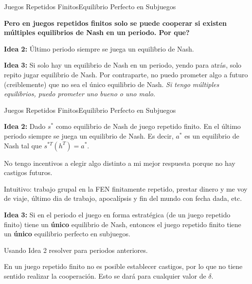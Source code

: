 \documentclass[notes, 11pt]{beamer} %
\newenvironment{wideitemize}{\itemize\addtolength{\itemsep}{10pt}}{\enditemize}
\begin{document}
\begin{frame}{Juegos Repetidos Finitos}{Equilibrio Perfecto en Subjuegos}
	\begin{wideitemize}

		\item<1-> \textbf{Pero en juegos repetidos finitos solo se puede cooperar si existen m\'ultiples equilibrios de Nash en un periodo. Por que? }
		\begin{wideitemize}
			\item<2->[*] \textbf{Idea 2:} \'Ultimo periodo siempre se juega un equilibrio de Nash.
			\item<3->[*] \textbf{Idea 3:} Si solo hay un equilibrio de Nash en un periodo, yendo para atr\'as, solo repito jugar equilibrio de Nash. Por contraparte, no puedo prometer algo a futuro (creiblemente) que no sea el \'unico equilibrio de Nash. \textit{Si tengo m\'ultiples equilibrios, puedo prometer uno bueno o uno malo.}
		\end{wideitemize}

	\end{wideitemize}
\end{frame}



\begin{frame}{Juegos Repetidos Finitos}{Equilibrio Perfecto en Subjuegos}
	\begin{wideitemize}
		\item<1-> \textbf{Idea 2:} Dado $s^{*}$ como equilibrio de Nash de juego repetido finito. En el \'ultimo periodo siempre se juega un equilibrio de Nash. Es decir, $a^{*}$ es un equilibrio de Nash tal que $s^{*T}(h^{T}) = a^{*}$.
			\begin{wideitemize}
				\item<2->[--] No tengo incentivos a elegir algo distinto a mi mejor respuesta porque no hay castigos futuros.
				\item<3->[--] Intuitivo: trabajo grupal en la FEN finitamente repetido, prestar dinero y me voy de viaje, \'ultimo dia de trabajo, apocal\'ipsis y fin del mundo con fecha dada, etc.
			\end{wideitemize}
		\item<4-> \textbf{Idea 3:} Si en el periodo el juego en forma estrat\'egica (de un juego repetido finito) tiene un \textbf{\'unico} equilibrio de Nash, entonces el juego repetido finito tiene un \textbf{\'unico} equilibrio perfecto en subjuegos.
			\begin{wideitemize}
				\item<5->[--] Usando Idea 2 resolver para periodos anteriores.
				\item<6->[--] En un juego repetido finito no es posible establecer castigos, por lo que no tiene sentido realizar la cooperaci\'on. Esto se dar\'a para cualquier valor de $\delta$.
			\end{wideitemize}
	\end{wideitemize}
\end{frame}
\end{document}
